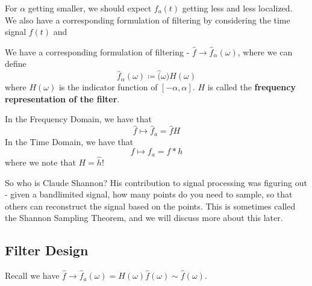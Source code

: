\documentclass{article}
\begin{document}
For $\alpha$ getting smaller, we should expect $f_a(t)$ getting less and less localized.\\

We also have a corresponding formulation of filtering by considering the time signal $f(t)$ and
\begin{definition}
We have a corresponding formulation of filtering - $\widehat{f} \to \widehat{f}_\alpha(\omega)$, where we can define
\[\widehat{f}_\alpha(\omega) \coloneqq \widehat(\omega) H(\omega)\]
where $H(\omega)$ is the indicator function of $[-\alpha, \alpha]$. $H$ is called the \textbf{frequency representation of the filter}.
\end{definition}

In the Frequency Domain, we have that
\[\widehat{f} \mapsto \widehat{f}_a = \widehat{f} H\]
In the Time Domain, we have that
\[f \mapsto f_a = f*h\]
where we note that $H = \widehat{h}$!

\begin{remark}
    So who is Claude Shannon? His contribution to signal processing was figuring out - given a bandlimited signal, how many points do you need to sample, so that others can reconstruct the signal based on the points. This is sometimes called the Shannon Sampling Theorem, and we will discuss more about this later.
\end{remark}

\subsection{Filter Design}

Recall we have $\widehat{f} \to \widehat{f}_a(\omega) = H(\omega) \widehat{f}(\omega) \sim \widehat{f}(\omega)$.\\
\end{document}
